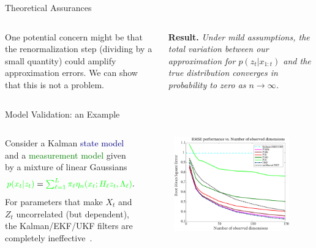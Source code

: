 \documentclass[aspectratio=169,19pt,xetex,handout]{beamer}
\begin{document}
\begin{frame}{Theoretical Assurances}
\Large
\begin{columns}[T] %

One potential concern might be that the renormalization step (dividing by a small quantity) could amplify approximation errors.  We can show that this is not a problem.
 

\raggedleft
\textbf{Result.}
\emph{Under mild assumptions, the total variation between our approximation for $p(z_t|x_{1:t})$ and the true distribution converges in probability to zero as $n\to\infty$.}

\end{columns}
\end{frame}

\begin{frame}{Model Validation: an Example}
\Large
\begin{columns}[T] %

Consider a Kalman \textcolor{navy}{state model} and a \textcolor{green}{measurement model} given by a mixture of linear Gaussians
 \[ 
 \textcolor{green}{p(x_t|z_t)} = \textstyle \textcolor{green}{\sum_{\ell=1}^L \pi_\ell \eta_n(x_t;H_\ell z_t,\Lambda_\ell)}. 
 \]
For parameters that make $X_t$ and $Z_t$ uncorrelated (but dependent), the Kalman/EKF/UKF filters are completely ineffective~\cite{Kus67}.
 
\begin{figure}
\includegraphics[width=\textwidth]{mdl62results}
\end{figure}

\end{columns}
\end{frame}
\end{document}

